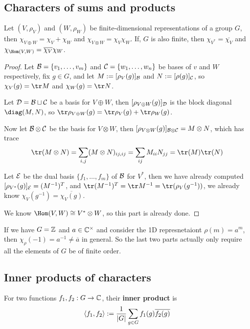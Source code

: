 \documentclass{article}
\begin{document}
\subsection{Characters of sums and products}

\begin{proposition}
    Let $(V,\rho_V)$ and $(W,\rho_W)$ be finite-dimensional representations of a group $G$, then $\chi_{V\oplus W} = \chi_V+\chi_W$ and $\chi_{V\otimes W} = \chi_V\chi_W$. If, $G$ is also finite, then $\chi_{V^*}=\overline{\chi_V}$ and $\chi_{\Hom(V,W)}=\overline{\chi_V}\chi_W$.\begin{proof}
        Let $\mathcal{B}=\{v_1,\ldots,v_m\}$ and $\mathcal{C} = \{w_1,\ldots, w_n\}$ be bases of $v$ and $W$ respectively, fix $g\in G$, and let $M:=[\rho_V(g)]_{\mathcal{B}}$ and $N:=[\rho(g)]_{\mathcal{C}}$, so $\chi_V(g)=\tr M$ and $\chi_W(g) = \tr N$.

        Let $\mathcal{D} = \mathcal{B}\sqcup \mathcal{C}$ be a basis for $V\oplus W$, then $[\rho_{V\oplus W}(g)]_{\mathcal{D}}$ is the block diagonal $\diag(M,N)$, so $\tr\rho_{V\oplus W}(g) = \tr\rho_V(g) + \tr\rho_W(g)$.

        Now let $\mathcal{B}\otimes \mathcal{C}$ be the basis for $V\otimes W$, then $[\rho_{V\otimes W}(g)]_{\mathcal{B}\otimes \mathcal{C}} = M\otimes N$, which has trace \[
        \tr(M\otimes N) = \sum_{i,j}(M\otimes N)_{ij,ij} = \sum_{ij}M_{ii}N_{jj} = \tr(M)\tr(N)
        \]

        Let $\mathcal{E}$ be the dual basis $\{f_1,\ldots, f_m\}$ of $\mathcal{B}$ for $V^*$, then we have already computed $[\rho_{V^*}(g)]_{\mathcal{E}} = (M^{-1})^T$, and $\tr(M^{-1})^T = \tr M^{-1} = \tr(\rho_V(g^{-1}))$, we already know $\chi_V(g^{-1}) = \overline{\chi_V(g)}$.

        We know $\Hom(V,W)\cong V^*\otimes W$, so this part is already done.
    \end{proof}
\end{proposition}

If we have $G=\mathbb{Z}$ and $a\in\mathbb{C}^\times$ and consider the 1D represnetaiont $\rho(m) = a^m$, then $\chi_\rho(-1)=a^{-1}\neq \overline{a}$ in general. So the last two parts actually only require all the elements of $G$ be of finite order.

\subsection{Inner products of characters}

\begin{definition}
    For two functions $f_1,f_2:G\rightarrow \mathbb{C}$, their \textbf{inner product} is \[
    \left\langle f_1,f_2 \right\rangle := \frac{1}{\left| G \right|}\sum_{g\in G}f_1(g)\overline{f_2(g)}
    \]
\end{definition}
\end{document}
